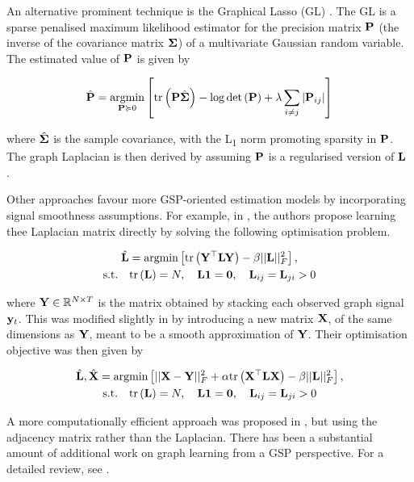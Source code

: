 An alternative prominent technique is the Graphical Lasso (GL) \citep{Friedman2007}. The GL is a sparse penalised maximum likelihood estimator for the precision matrix $\mathbf{P}$ (the inverse of the covariance matrix $\mathbf{\Sigma}$) of a multivariate Gaussian random variable. The estimated value of $\mathbf{P}$ is given by 

\begin{equation}
    \hat{\mathbf{P}} = \underset{\mathbf{P} \succcurlyeq 0}{\text{argmin}} \left[\text{\textup{tr}}\left(\mathbf{P} \hat{\mathbf{\Sigma}}\right) - \log \det \left(\mathbf{P}\right) + \lambda \sum_{i\neq j} |\mathbf{P}_{ij}|\right]
\end{equation}

where $\hat{\mathbf{\Sigma}}$ is the sample covariance, with the L\textsubscript{1} norm promoting sparsity in $\mathbf{P}$. The graph Laplacian is then derived by assuming $\mathbf{P}$ is a regularised version of $\mathbf{L}$ \citep{Lake2010}. 

Other approaches favour more GSP-oriented estimation models by incorporating signal smoothness assumptions. For example, in \cite{Hu2015}, the authors propose learning thee Laplacian matrix directly by solving the following optimisation problem. 

\begin{equation}
    \begin{gathered}
        \hat{\mathbf{L}} = \text{argmin} \left[ \text{\textup{tr}}\left(\mathbf{Y}^\top \mathbf{L} \mathbf{Y}\right) - \beta ||\mathbf{L} ||_F^2 \right], \\ \text{s.t.} \quad \text{\textup{tr}}\left(\mathbf{L}\right) = N, \quad \mathbf{L} \mathbf{1} = \mathbf{0}, \quad \mathbf{L}_{ij} = \mathbf{L}_{ji} >0
    \end{gathered}
\end{equation}

where $\mathbf{Y} \in \mathbb{R}^{N \times T}$ is the matrix obtained by stacking each observed graph signal $\mathbf{y}_t$. This was modified slightly in \cite{Dong2016} by introducing a new matrix $\mathbf{X}$, of the same dimensions as $\mathbf{Y}$, meant to be a smooth approximation of $\mathbf{Y}$. Their optimisation objective was then given by 

\begin{equation}
    \begin{gathered}
        \hat{\mathbf{L}}, \hat{\mathbf{X}} = \text{argmin} \left[ ||\mathbf{X} - \mathbf{Y}||_F^2 + \alpha \text{\textup{tr}}\left(\mathbf{X}^\top \mathbf{L} \mathbf{X}\right) - \beta ||\mathbf{L} ||_F^2 \right], \\ \text{s.t.} \quad \text{\textup{tr}}\left(\mathbf{L}\right) = N, \quad \mathbf{L} \mathbf{1} = \mathbf{0}, \quad \mathbf{L}_{ij} = \mathbf{L}_{ji} > 0
    \end{gathered}
\end{equation}

A more computationally efficient approach was proposed in \cite{Kalofolias2016}, but using the adjacency matrix rather than the Laplacian. There has been a substantial amount of additional work on graph learning from a GSP perspective. For a detailed review, see \cite{Dong2019,Mateos2019}. 


